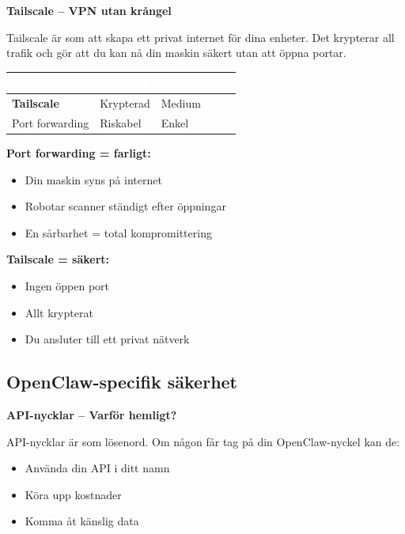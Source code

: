 \documentclass[12pt,a4paper,swedish]{article}
\begin{document}
\bigskip

\textbf{Tailscale – VPN utan krångel}

Tailscale är som att skapa ett privat internet för dina enheter. Det krypterar all trafik och gör att du kan nå din maskin säkert utan att öppna portar.

\bigskip

\begin{center}
\begin{tabular}{|p{4cm}|p{5cm}|p{5cm}|}
\hline
\rowcolor{secondary}
\textcolor{white}{\textbf{Metod}} & \textcolor{white}{\textbf{Säkerhet}} & \textcolor{white}{\textbf{Komplexitet}} \\
\hline
\textbf{Tailscale} & \color{success}Krypterad\color{black} & Medium \\
\hline
Port forwarding & \color{warning}Riskabel\color{black} & Enkel \\
\hline
\end{tabular}
\end{center}

\bigskip

\textbf{Port forwarding = farligt:}
\begin{itemize}
    \item Din maskin syns på internet
    \item Robotar scanner ständigt efter öppningar
    \item En sårbarhet = total kompromittering
\end{itemize}

\bigskip

\textbf{Tailscale = säkert:}
\begin{itemize}
    \item Ingen öppen port
    \item Allt krypterat
    \item Du ansluter till ett privat nätverk
\end{itemize}

\subsection{OpenClaw-specifik säkerhet}
\label{sec:openclaw-sakerhet}

\textbf{API-nycklar – Varför hemligt?}

API-nycklar är som lösenord. Om någon får tag på din OpenClaw-nyckel kan de:
\begin{itemize}
    \item Använda din API i ditt namn
    \item Köra upp kostnader
    \item Komma åt känslig data
\end{itemize}
\end{document}
